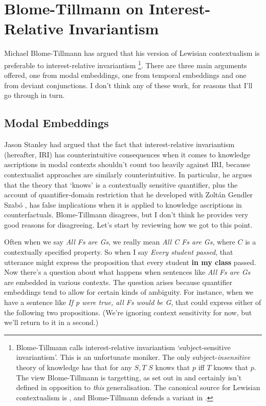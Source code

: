 \chapter{Blome-Tillmann on Interest-Relative Invariantism}
\unpub{}

\noindent Michael Blome-Tillmann has argued that his version of Lewisian contextualism is preferable to interest-relative invariantism \citep{MBT2009}\footnote{Blome-Tillmann calls interest-relative invariantism `subject-sensitive invariantism'. This is an unfortunate moniker. The only subject-\textit{insensitive} theory of knowledge has that for any \(S, T\) $S$ knows that $p$ iff $T$ knows that $p$. The view Blome-Tillmann is targetting, as set out in \citet{Fantl2002, Hawthorne2004, Stanley2005-STAKAP} and \citet{Weatherson2005-WEACWD} certainly isn't defined in opposition to \textit{this} generalisation. The canonical source for Lewisian contextualism is \citet{Lewis1996b}, and Blome-Tillmann defends a variant in \citet{MBT2009a}.}. There are three main arguments offered, one from modal embeddings, one from temporal embeddings and one from deviant conjunctions. I don't think any of these work, for reasons that I'll go through in turn.

\section{Modal Embeddings}
Jason Stanley had argued that the fact that interest-relative invariantism (hereafter, IRI) has counterintuitive consequences when it comes to knowledge ascriptions in modal contexts shouldn't count too heavily against IRI, because contextualist approaches are similarly counterintuitive. In particular, he argues that the theory that `knows' is a contextually sensitive quantifier, plus the account of quantifier-domain restriction that he developed with Zolt\'{a}n Gendler Szab\'{o} \citep{Stanley2000-STAOQD}, has false implications when it is applied to knowledge ascriptions in counterfactuals. Blome-Tillmann disagrees, but I don't think he provides very good reasons for disagreeing. Let's start by reviewing how we got to this point.

Often when we say \textit{All Fs are Gs}, we really mean \textit{All C Fs are Gs}, where $C$ is a contextually specified property. So when I say \textit{Every student passed}, that utterance might express the proposition that every student \textbf{in my class} passed. Now there's a question about what happens when sentences like \textit{All Fs are Gs} are embedded in various contexts. The question arises because quantifier embeddings tend to allow for certain kinds of ambiguity. For instance, when we have a sentence like \textit{If p were true, all Fs would be G}, that could express either of the following two propositions. (We're ignoring context sensitivity for now, but we'll return to it in a second.)

